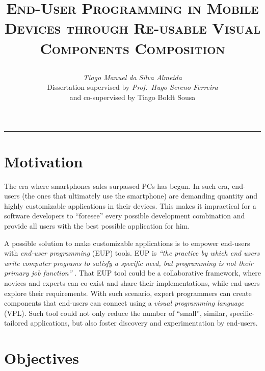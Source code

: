 \documentclass[9pt,a4paper]{extarticle}
\begin{document}
\title{\vspace*{-8mm}\textbf{\textsc{End-User Programming in Mobile Devices
through Re-usable Visual Components Composition}}
\author{\emph{Tiago Manuel da Silva Almeida}\\[2mm]
\small{Dissertation supervised by \emph{Prof.\ Hugo Sereno Ferreira}}\\
\small{and co-supervised by Tiago Boldt Sousa}}}
\date{}
\maketitle
\thispagestyle{empty}

\vspace*{-4mm}\noindent\rule{\textwidth}{0.4pt}\vspace*{4mm}

\begin{multicols}{2}

\section{Motivation}\label{sec:motiva}

The era where smartphones sales surpassed PCs has begun. In such era, end-users (the ones that ultimately use the smartphone) 
are demanding quantity and highly customizable applications in their devices. 
This makes it impractical for a software developers to ``foresee'' every possible development combination and provide all users with the best possible application for him. 

A possible solution to make customizable applications is to empower end-users with \emph{end-user programming} (EUP) tools. 
EUP is \emph{``the practice by which end users write computer programs to satisfy a specific need, but programming is not their primary job function''} \cite{EUSEReport}.
That EUP tool could be a collaborative framework, where novices and experts can co-exist and share their implementations, while end-users explore their requirements. With such scenario, expert programmers can create components that end-users can connect using a \emph{visual programming language} (VPL). Such tool could not only reduce the number of ``small'', similar, specific-tailored applications, but also foster discovery and experimentation by end-users.

\section{Objectives}\label{sec:goals}


\end{multicols}
\end{document}
